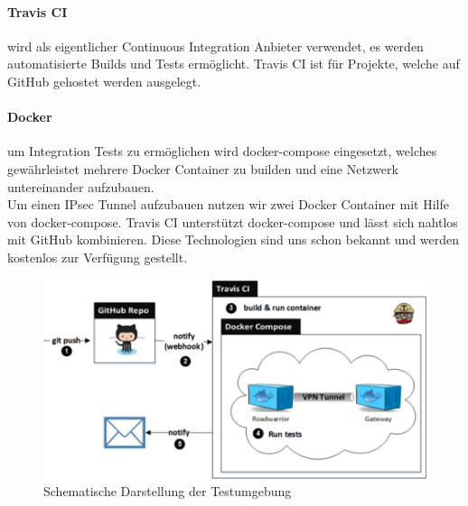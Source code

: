 \paragraph{Travis CI} wird als eigentlicher Continuous Integration Anbieter verwendet, es werden automatisierte Builds und Tests ermöglicht. Travis CI ist für Projekte, welche auf GitHub gehostet werden ausgelegt.

\paragraph{Docker} um Integration Tests zu ermöglichen wird docker-compose eingesetzt, welches gewährleistet mehrere Docker Container zu builden und eine Netzwerk untereinander aufzubauen. \\
Um einen IPsec Tunnel aufzubauen nutzen wir zwei Docker Container mit Hilfe von docker-compose. Travis CI unterstützt docker-compose und lässt sich nahtlos mit GitHub kombinieren. Diese Technologien sind uns schon bekannt und werden kostenlos zur Verfügung gestellt.

\begin{figure}[H]
\centering
\includegraphics[width=420pt]{images/testing.png}
\caption[Schematische Darstellung der Testumgebung]{Schematische Darstellung der Testumgebung}
\end{figure}
